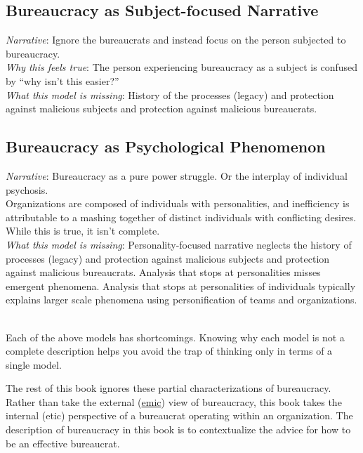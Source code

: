 \subsection*{Bureaucracy as Subject-focused Narrative}
\textit{Narrative}: Ignore the bureaucrats and instead focus on the person subjected to bureaucracy. \\
\textit{Why this feels true}: The person experiencing bureaucracy as a subject is confused by ``why isn't this easier?''  \\
\textit{What this model is missing}: History of the processes (legacy) and protection against malicious subjects and protection against malicious bureaucrats. 


\subsection*{Bureaucracy as Psychological Phenomenon}

\textit{Narrative}: Bureaucracy as a pure power struggle. Or the interplay of individual psychosis. \\



Organizations are composed of individuals with personalities, and inefficiency is attributable to a mashing together of distinct individuals with conflicting desires.
While this is true, it isn't complete. \\
\textit{What this model is missing}: Personality-focused narrative neglects the history of processes (legacy) and protection against malicious subjects and protection against malicious bureaucrats. Analysis that stops at personalities misses emergent phenomena. Analysis that stops at personalities of individuals typically explains larger scale phenomena using personification of teams and organizations. 

\ \\

Each of the above models has shortcomings. Knowing why each model is not a complete description helps you avoid the trap of thinking only in terms of a single model. 

The rest of this book ignores these partial characterizations of bureaucracy. 
Rather than take the external (\href{https://en.wikipedia.org/wiki/Emic_and_etic}{emic}) view of bureaucracy, this book takes the internal (etic) perspective of a bureaucrat operating within an organization. 
The description of bureaucracy in this book is to contextualize the advice for how to be an effective bureaucrat. 